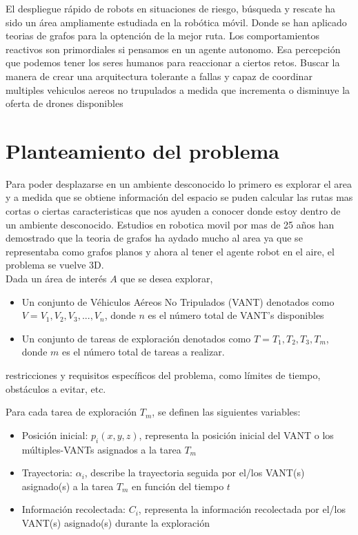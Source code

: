 \documentclass[11pt,epsf,times]{article}
\begin{document}
El despliegue rápido de robots en situaciones de riesgo, búsqueda y rescate ha sido un área ampliamente estudiada en la robótica móvil. Donde se han aplicado teorias de grafos para la optención de la mejor ruta. Los comportamientos reactivos son primordiales si pensamos en un agente autonomo. Esa percepción que podemos tener los seres humanos para reaccionar a ciertos retos. Buscar la manera de crear una arquitectura tolerante a fallas y capaz de coordinar multiples vehiculos aereos no trupulados a medida que incrementa o disminuye la oferta de drones disponibles


\section{Planteamiento del problema}

Para poder desplazarse en un ambiente desconocido lo primero es explorar el area y a medida que se obtiene información del espacio se puden calcular las rutas mas cortas o ciertas caracteristicas que nos ayuden a conocer donde estoy dentro de un ambiente desconocido. Estudios en robotica movil por mas de 25 años han demostrado que la teoria de grafos ha aydado mucho al area ya que se representaba como grafos planos y ahora al tener el agente robot en el aire, el problema se vuelve 3D.\\

Dada un área de interés $A$ que se desea explorar,
\begin{itemize}
\item Un conjunto de Véhiculos Aéreos No Tripulados (VANT) denotados como $V = V_{1},V_{2},V_{3},...,V_{n}$, donde $n$ es el número total de VANT's disponibles
\item Un conjunto de tareas de exploración denotados como $T = T_{1}, T_{2}, T_{3}, T_{m}$, donde $m$ es el número total de tareas a realizar.
\end{itemize}

restricciones y requisitos específicos del problema, como límites de tiempo, obstáculos a evitar, etc.

Para cada tarea de exploración $T_{m}$, se definen las siguientes variables:

\begin{itemize}
\item Posición inicial: $p_{i}(x,y,z)$, representa la posición inicial del VANT o los múltiples-VANTs asignados a la tarea $T_{m}$
\item Trayectoria: $\alpha_{i}$, describe la trayectoria seguida por el/los VANT(s) asignado(s) a la tarea $T_{m}$ en función del tiempo $t$
\item Información recolectada: $C_{i}$, representa la información recolectada por el/los VANT(s) asignado(s) durante la exploración
\end{itemize}
\end{document}
